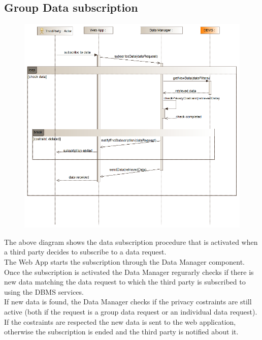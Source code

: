 \subsection{Group Data subscription}
\begin{figure}[H]
\centering
\includegraphics[width=\linewidth]{resources/uml/sequence/GroupDataSubscription.png}
\end{figure}
The above diagram shows the data subscription procedure that is activated when a third party decides to subscribe to a data request.\\
The Web App starts the subscription through the Data Manager component. Once the subscription is activated the Data Manager regurarly checks if there is new data matching the data request to which the third party is subscribed to using the DBMS services.\\
If new data is found, the Data Manager checks if the privacy costraints are still active (both if the request is a group data request or an individual data request).\\
If the costraints are respected the new data is sent to the web application, otherwise the subscription is ended and the third party is notified about it.


